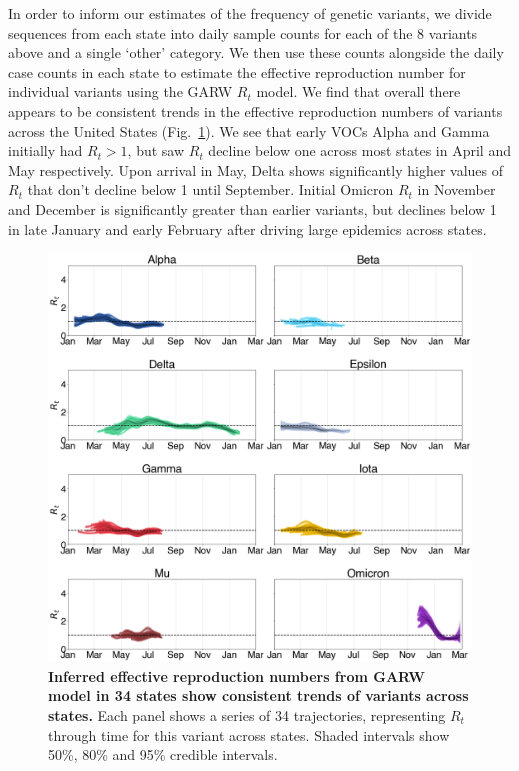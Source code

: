 \documentclass[11pt,oneside,letterpaper]{article}
\begin{document}
In order to inform our estimates of the frequency of genetic variants, we divide sequences from each state into daily sample counts for each of the 8 variants above and a single `other' category.
We then use these counts alongside the daily case counts in each state to estimate the effective reproduction number for individual variants using the GARW $R_{t}$ model.
We find that overall there appears to be consistent trends in the effective reproduction numbers of variants across the United States (Fig.\ \ref{fig:rt_consensus}).
We see that early VOCs Alpha and Gamma initially had $R_t>1$, but saw $R_t$ decline below one across most states in April and May respectively.
Upon arrival in May, Delta shows significantly higher values of $R_t$ that don't decline below 1 until September.
Initial Omicron $R_t$ in November and December is significantly greater than earlier variants, but declines below 1 in late January and early February after driving large epidemics across states.

\begin{figure}[h!]
  \centering
  \includegraphics[width=\linewidth]{figs/rt_consensus.png}
  \caption{\textbf{Inferred effective reproduction numbers from GARW model in 34 states show consistent trends of variants across states.}
  Each panel shows a series of 34 trajectories, representing $R_t$ through time for this variant across states.
  Shaded intervals show 50\%, 80\% and 95\% credible intervals.
  }
  \label{fig:rt_consensus}
\end{figure}
\end{document}
